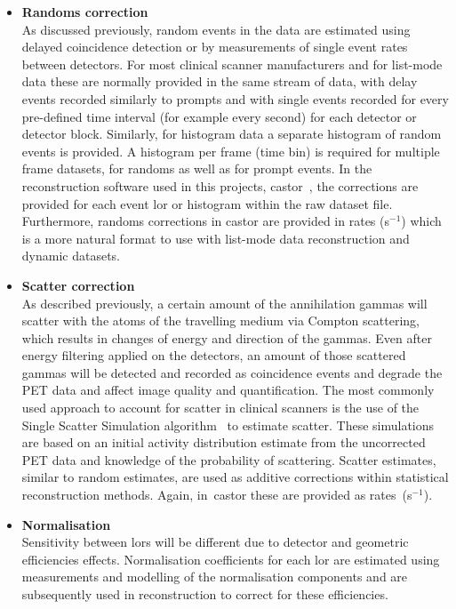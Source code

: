 \begin{itemize}
\item\textbf{Randoms correction}\\
As discussed previously, random events in the data are estimated using delayed coincidence detection or by measurements of single event rates between detectors. For most clinical scanner manufacturers and for list-mode data these are normally provided in the same stream of data, with delay events recorded similarly to prompts and with single events recorded for every pre-defined time interval (for example every second) for each detector or detector block. Similarly, for histogram data a separate histogram of random events is provided. A histogram per frame (time bin) is required for multiple frame datasets, for randoms as well as for prompt events. 
In the reconstruction software used in this projects, \gls{castor}~\cite{Merlin2018}, the corrections are provided for each event \gls{lor} or histogram within the raw dataset file. Furthermore, randoms corrections in \gls{castor} are provided in rates (s$^{-1}$) which is a more natural format to use with list-mode data reconstruction and dynamic datasets.
\item\textbf{Scatter correction}\\
As described previously, a certain amount of the annihilation gammas will scatter with the atoms of the travelling medium via Compton scattering, which results in changes of energy and direction of the gammas. Even after energy filtering applied on the detectors, an amount of those scattered gammas will be detected and recorded as coincidence events and degrade the PET data and affect image quality and quantification. The most commonly used approach to account for scatter in clinical scanners is the use of the Single Scatter Simulation algorithm~\cite{Watson1996} to estimate scatter. These simulations are based on an initial activity distribution estimate from the uncorrected PET data and knowledge of the probability of scattering. 
Scatter estimates, similar to random estimates, are used as additive corrections within statistical reconstruction methods. Again, in~\gls{castor} these are provided as \mbox{rates (s$^{-1}$)}. 
\item\textbf{Normalisation}\\ 
Sensitivity between \glspl{lor} will be different due to detector and geometric efficiencies effects. Normalisation coefficients for each \gls{lor} are estimated using measurements and modelling of the normalisation components and are subsequently used in reconstruction to correct for these efficiencies.

\end{itemize}
